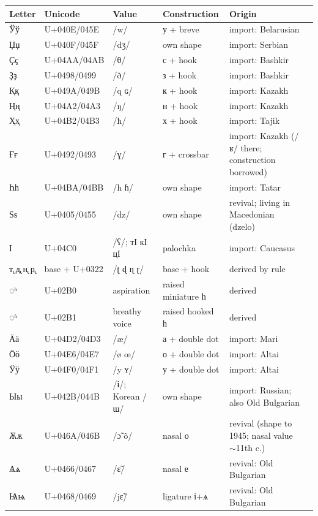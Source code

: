 \documentclass[12pt]{article}
\newcommand{\cz}[1]{{\chu #1}}
\newcommand{\ph}[1]{{\ipafont/#1/}}
\begin{document}
\begin{table}[ht]\centering\footnotesize\setlength{\tabcolsep}{3.5pt}
\begin{tabular}{llllll}
\toprule
Letter & Unicode & Value & Construction & Origin \\
\midrule
\cz{Ўў} & U+040E/045E & \ph{w} & у + breve & import: Belarusian \\
\cz{Џџ} & U+040F/045F & \ph{dʒ} & own shape & import: Serbian \\
\cz{Ҫҫ} & U+04AA/04AB & \ph{θ} & с + hook & import: Bashkir \\
\cz{Ҙҙ} & U+0498/0499 & \ph{ð} & з + hook & import: Bashkir \\
\cz{Ққ} & U+049A/049B & \ph{q ɢ} & к + hook & import: Kazakh \\
\cz{Ңң} & U+04A2/04A3 & \ph{ŋ} & н + hook & import: Kazakh \\
\cz{Ҳҳ} & U+04B2/04B3 & \ph{ħ} & х + hook & import: Tajik \\
\cz{Ғғ} & U+0492/0493 & \ph{ɣ} & г + crossbar & import: Kazakh (\ph{ʁ} there; construction borrowed) \\
\cz{Һһ} & U+04BA/04BB & \ph{h ɦ} & own shape & import: Tatar \\
\cz{Ѕѕ} & U+0405/0455 & \ph{dz} & own shape & revival; living in Macedonian (dzelo) \\
\cz{Ӏ} & U+04C0 & \ph{ʕ}; \cz{тӀ кӀ цӀ} & palochka & import: Caucasus \\
\cz{т̢ д̢ н̢ р̢} & base + U+0322 & \ph{ʈ ɖ ɳ ɽ} & base + hook & derived by rule \\
\cz{◌ʰ} & U+02B0 & aspiration & raised miniature \cz{һ} & derived \\
\cz{◌ʱ} & U+02B1 & breathy voice & raised hooked \cz{һ} & derived \\
\cz{Ӓӓ} & U+04D2/04D3 & \ph{æ} & а + double dot & import: Mari \\
\cz{Ӧӧ} & U+04E6/04E7 & \ph{ø œ} & о + double dot & import: Altai \\
\cz{Ӱӱ} & U+04F0/04F1 & \ph{y ʏ} & у + double dot & import: Altai \\
\cz{Ыы} & U+042B/044B & \ph{ɨ}; Korean \ph{ɯ} & own shape & import: Russian; also Old Bulgarian \\
\cz{Ѫѫ} & U+046A/046B & \ph{ɔ̃ õ} & nasal о & revival (shape to 1945; nasal value $\sim$11th c.) \\
\cz{Ѧѧ} & U+0466/0467 & \ph{ɛ̃} & nasal е & revival: Old Bulgarian \\
\cz{Ѩѩ} & U+0468/0469 & \ph{jɛ̃} & ligature і+ѧ & revival: Old Bulgarian \\

\end{tabular}
\end{table}
\end{document}
